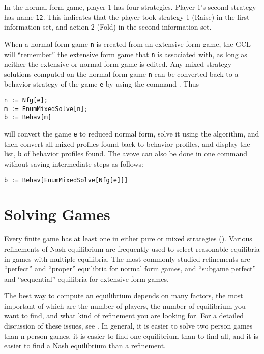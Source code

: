 In the normal form game, player 1 has four strategies.  Player 1's
second strategy has name \verb+12+.  This indicates that the player
took strategy 1 (Raise) in the first information set, and action 2
(Fold) in the second information set.  

When a normal form game \verb+n+ is created from an extensive form
game, the GCL will ``remember'' the extensive form game that \verb+n+
is associated with, as long as neither the extensive or normal form
game is edited.  Any mixed strategy solutions computed on the normal
form game \verb+n+ can be converted back to a behavior strategy of the
game \verb+e+ by using the command .  Thus

\begin{verbatim}
n := Nfg[e];
m := EnumMixedSolve[n];
b := Behav[m]
\end{verbatim}

\noindent
will convert the game \verb+e+ to reduced normal form, solve it using
the  algorithm, and then convert all mixed profiles found back
to behavior profiles, and display the list, \verb+b+ of behavior
profiles found. The avove can also be done in one command without saving
intermediate steps as follows:  
  
\begin{verbatim}
b := Behav[EnumMixedSolve[Nfg[e]]]
\end{verbatim}

\chapter{Solving Games}

Every finite game has at least one  in either pure or mixed
strategies (\cite{Nash:1950}).  Various refinements of Nash
equilibrium are frequently used to select reasonable equilibria in
games with multiple equilibria.  The most commonly studied refinements
are ``perfect'' and ``proper'' equilibria for normal form games, and
``subgame perfect'' and ``sequential'' equilibria for extensive form
games.  

The best way to compute an equilibrium depends on many factors, the
most important of which are the number of players, the number of
equilibrium you want to find, and what kind of refinement you are
looking for.  For a detailed discussion of these issues, see
\cite{McKMcL:1996}.  In general, it is easier to solve two person
games than n-person games, it is easier to find one equilibrium than
to find all, and it is easier to find a Nash equilibrium than a
refinement.

